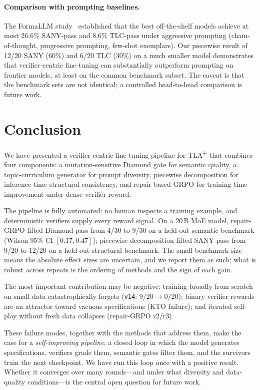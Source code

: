 \documentclass[11pt]{article}
\begin{document}
\paragraph{Comparison with prompting baselines.}
The FormaLLM study~\cite{ortiz2026formallm} established that the best
off-the-shelf models achieve at most 26.6\% SANY-pass and 8.6\%
TLC-pass under aggressive prompting (chain-of-thought, progressive
prompting, few-shot exemplars).  Our piecewise result of 12/20 SANY
(60\%) and 6/20 TLC (30\%) on a much smaller model demonstrates that
verifier-centric fine-tuning can substantially outperform prompting on
frontier models, at least on the common benchmark subset.  The caveat
is that the benchmark sets are not identical; a controlled head-to-head
comparison is future work.

\section{Conclusion}
\label{sec:conclusion}

We have presented a verifier-centric fine-tuning pipeline for
TLA\textsuperscript{+} that combines four components: a
mutation-sensitive Diamond gate for semantic quality, a
topic-curriculum generator for prompt diversity, piecewise
decomposition for inference-time structural consistency, and
repair-based GRPO for training-time improvement under dense
verifier reward.

The pipeline is fully automated: no human inspects a training
example, and deterministic verifiers supply every reward signal.  On
a 20\,B MoE model, repair-GRPO lifted Diamond-pass from 4/30 to
9/30 on a held-out semantic benchmark (Wilson 95\% CI $[0.17,0.47]$);
piecewise decomposition lifted SANY-pass from 9/20 to 12/20 on a
held-out structural benchmark.  The small benchmark size means the
absolute effect sizes are uncertain, and we report them as such;
what is robust across repeats is the ordering of methods and the
sign of each gain.

The most important contribution may be negative: training
broadly from scratch on small data catastrophically forgets
(\texttt{v14}: $9/20 \to 0/20$); binary verifier rewards are an
attractor toward vacuous specifications (KTO failure); and iterated
self-play without fresh data collapses (repair-GRPO r2/r3).

These failure modes, together with the methods that address them,
make the case for a \emph{self-improving pipeline}: a closed loop in
which the model generates specifications, verifiers grade them,
semantic gates filter them, and the survivors train the next
checkpoint.  We have run this loop once with a positive result.
Whether it converges over many rounds---and under what diversity and
data-quality conditions---is the central open question for future
work.
\end{document}
